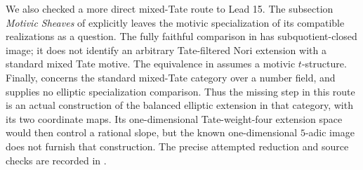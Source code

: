 We also checked a more direct mixed-Tate route to Lead 15.
The subsection \emph{Motivic Sheaves} of
\cite{fghUniversalMEM} explicitly leaves the motivic
specialization of its compatible realizations as a question.
The fully faithful comparison in
\cite[Proposition 10.3.3]{RootHuberMuellerStach2017} has
subquotient-closed image; it does not identify an arbitrary
Tate-filtered Nori extension with a standard mixed Tate
motive. The equivalence in
\cite[Theorem 1.5]{RootTubach2025} assumes a motivic
\(t\)-structure. Finally,
\cite[Theorem A]{RootKupersRudenkoSierra2026} concerns
the standard mixed-Tate category over a number field,
and supplies no elliptic specialization comparison.
Thus the missing step in this route is an actual
construction of the balanced elliptic extension in that
category, with its two coordinate maps. Its one-dimensional
Tate-weight-four extension space would then control a
rational slope, but the known one-dimensional
\(5\)-adic image does not furnish that construction.
The precise attempted reduction and source checks are
recorded in .

